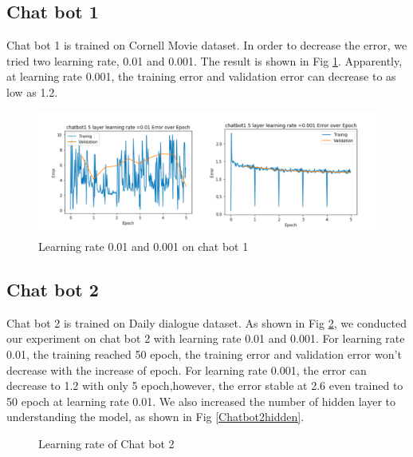 \documentclass[11pt,a4paper]{article}
\begin{document}
\subsection{Chat bot 1}
Chat bot 1 is trained on Cornell Movie dataset. In order to decrease the error, we tried two learning rate, 0.01 and 0.001. The result is shown in Fig \ref{Chatbot1}. Apparently, at learning rate 0.001, the training error and validation error can decrease to as low as 1.2.
\begin{figure}
    \centering
    \includegraphics[width =1\linewidth]{Fig/chatbot1.png}
    \caption{Learning rate 0.01 and 0.001 on chat bot 1}
    \label{Chatbot1}
\end{figure}

\subsection{Chat bot 2}
Chat bot 2 is trained on Daily dialogue dataset. As shown in Fig \ref{Chatbot2learningrate}, we conducted our experiment on chat bot 2 with learning rate 0.01 and 0.001. For learning rate 0.01, the training reached 50 epoch, the training error and validation error won't decrease with the increase of epoch. For learning rate 0.001, the error can decrease to 1.2 with only 5 epoch,however, the error stable at 2.6 even trained to 50 epoch at learning rate 0.01. We also increased the number of hidden layer to understanding the model, as shown in Fig \ref{Chatbot2hidden}. 
\begin{figure}
\centering
{}
  \hfill
  \hfill
\caption{Learning rate of Chat bot 2}
\label{Chatbot2learningrate}
\end{figure}
\end{document}
